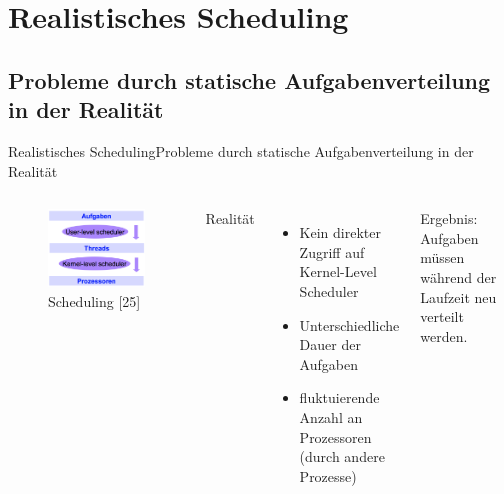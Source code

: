 \documentclass{beamer}
\begin{document}
\section{Realistisches Scheduling}
\subsection{Probleme durch statische Aufgabenverteilung in der Realit\"at}

\begin{frame}{Realistisches Scheduling}{Probleme durch statische Aufgabenverteilung in der Realit\"at}
\begin{columns}
        \begin{figure}
        \centering
        \includegraphics[width=1\columnwidth]{./assets/scheduler.png}
        \caption{Scheduling \cite{Herlihy1}[25]}
        \label{fig:my_label}
        \end{figure}
        
        
        Realit\"at
        \begin{itemize}
        \item Kein direkter Zugriff auf Kernel-Level Scheduler
        \item Unterschiedliche Dauer der Aufgaben
        \item fluktuierende Anzahl an Prozessoren (durch andere Prozesse)
        \end{itemize}
        
        Ergebnis: Aufgaben m\"ussen w\"ahrend der Laufzeit neu verteilt werden.
    
\end{columns}
\end{frame}
\end{document}
